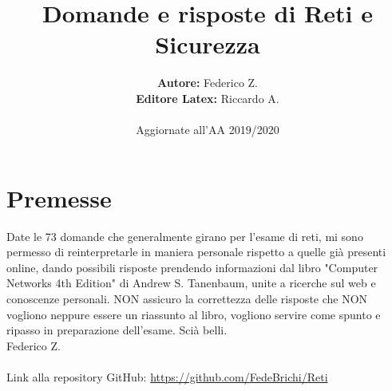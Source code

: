 

\author{\textbf{Autore:} Federico Z. \\ \textbf{Editore Latex:} Riccardo A. \\\\Aggiornate all'AA 2019/2020}
\title{\textbf{Domande e risposte di Reti e Sicurezza}}



\maketitle
\vspace{4cm}
\section*{Premesse}
Date le 73 domande che generalmente girano per l'esame di reti, mi sono permesso di reinterpretarle in maniera personale rispetto a quelle già presenti online, dando possibili risposte prendendo informazioni dal libro "Computer Networks 4th Edition" di Andrew S. Tanenbaum, unite a ricerche sul web e conoscenze personali. NON assicuro la correttezza delle risposte che NON vogliono neppure essere un riassunto al libro, vogliono servire come spunto e ripasso in preparazione dell'esame. Scià belli. \\
Federico Z. \\
\vspace{1cm} \\
Link alla repository GitHub: \url{https://github.com/FedeBrichi/Reti}

\newpage
\tableofcontents
\newpage



